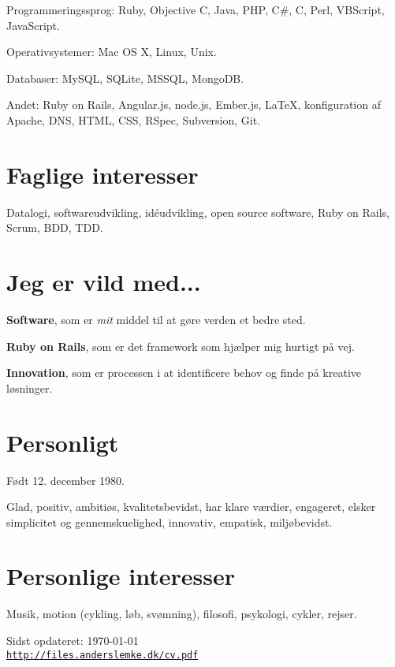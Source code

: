 \documentclass[a4paper]{article}
\renewenvironment{itemize}{
  \begin{list}{}
    { \setlength{\itemsep}{5pt}
      \setlength{\parsep}{0pt}
      \setlength{\topsep}{0pt}
      \setlength{\leftmargin}{0em} } }{
  \end{list}}
\begin{document}
\begin{itemize}
\item Programmeringssprog: Ruby, Objective C, Java, PHP, C\#, C, Perl, VBScript, JavaScript.
\item Operativsystemer: Mac OS X, Linux, Unix.
\item Databaser: MySQL, SQLite, MSSQL, MongoDB.
\item Andet: Ruby on Rails, Angular.js, node.js, Ember.js, \LaTeX, konfiguration af Apache, DNS, HTML, CSS, RSpec, Subversion, Git.
\end{itemize}

\section*{Faglige interesser}

Datalogi, softwareudvikling, idéudvikling, open source software, Ruby on Rails, Scrum, BDD, TDD.

\section*{Jeg er vild med...}

\begin{itemize}
  \item \textbf{Software}, som er \emph{mit} middel til at gøre verden et bedre sted.
  \item \textbf{Ruby on Rails}, som er det framework som hjælper mig hurtigt på vej.
  \item \textbf{Innovation}, som er processen i at identificere behov og finde på kreative løsninger.
\end{itemize}

\section*{Personligt}
Født 12. december 1980.

Glad, positiv, ambitiøs, kvalitetsbevidst, har klare værdier, engageret, elsker simplicitet og gennemskuelighed, innovativ, empatisk, miljøbevidst.


\section*{Personlige interesser} 

Musik, motion (cykling, løb, svømning), filosofi, psykologi, cykler, rejser.

\bigskip

\begin{center}
\begin{footnotesize}
Sidst opdateret: \today \\
\href{http://files.anderslemke.dk/cv.pdf}{\tt http://files.anderslemke.dk/cv.pdf}
\end{footnotesize}
\end{center}
\end{document}

